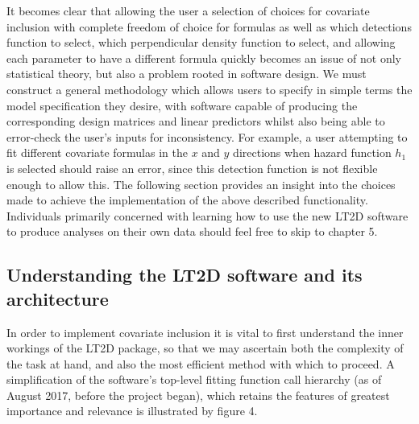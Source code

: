 \documentclass[11pt]{article}
\begin{document}
\begin{multicols}{2}
It becomes clear that allowing the user a selection of choices for covariate inclusion with complete freedom of choice for formulas as well as which detections function to select, which perpendicular density function to select, and allowing each parameter to have a different formula quickly becomes an issue of not only statistical theory, but also a problem rooted in software design. We must construct a general methodology which allows users to specify in simple terms the model specification they desire, with software capable of producing the corresponding design matrices and linear predictors whilst also being able to error-check the user's inputs for inconsistency. For example, a user attempting to fit different covariate formulas in the $x$ and $y$ directions when hazard function $h_1$ is selected should raise an error, since this detection function is not flexible enough to allow this. The following section provides an insight into the choices made to achieve the implementation of the above described functionality. Individuals primarily concerned with learning how to use the new LT2D software to produce analyses on their own data should feel free to skip to chapter 5.

\subsection{Understanding the LT2D software and its architecture}
In order to implement covariate inclusion it is vital to first understand the inner workings of the LT2D package, so that we may ascertain both the complexity of the task at hand, and also the most efficient method with which to proceed. A simplification of the software's top-level fitting function call hierarchy (as of August 2017, before the project began), which retains the features of greatest importance and relevance is illustrated by figure 4.


\end{multicols}
\end{document}
